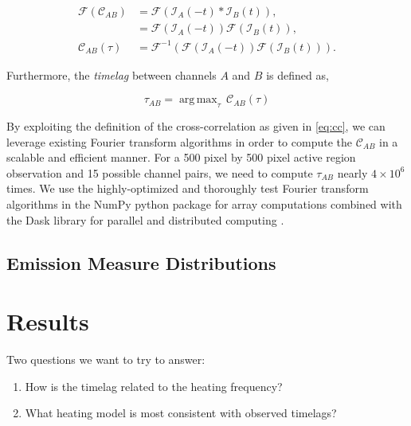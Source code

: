 \documentclass[preprint,linenumbers]{aastex62}
\DeclareMathOperator*{\argmax}{arg\,max} %
\begin{document}
\begin{align}\label{eq:cc}
    \mathcal{F}(\mathcal{C}_{AB}) &= \mathcal{F}(\mathcal{I}_A(-t)\ast\mathcal{I}_B(t)), \nonumber\\
    &= \mathcal{F}(\mathcal{I}_A(-t))\mathcal{F}(\mathcal{I}_B(t)), \nonumber\\
    \mathcal{C}_{AB}(\tau) &= \mathcal{F}^{-1}(\mathcal{F}(\mathcal{I}_A(-t))\mathcal{F}(\mathcal{I}_B(t))).
\end{align}

Furthermore, the \textit{timelag} between channels $A$ and $B$ is defined as,

\begin{equation}
    \tau_{AB} = \argmax_{\tau}\,\mathcal{C}_{AB}(\tau)
\end{equation}

By exploiting the definition of the cross-correlation as given in \autoref{eq:cc}, we can leverage existing Fourier transform algorithms in order to compute the $\mathcal{C}_{AB}$ in a scalable and efficient manner. For a 500 pixel by 500 pixel active region observation and 15 possible channel pairs, we need to compute $\tau_{AB}$ nearly $4\times10^6$ times. We use the highly-optimized and thoroughly test Fourier transform algorithms in the NumPy python package for array computations \citep{oliphant_guide_2006} combined with the Dask library for parallel and distributed computing \citep{dask_development_team_dask_2016}.


\subsection{Emission Measure Distributions}
\label{em_dist}


\section{Results}
\label{results}

Two questions we want to try to answer:
\begin{enumerate}
    \item How is the timelag related to the heating frequency?
    \item What heating model is most consistent with observed timelags?
\end{enumerate}
\end{document}
